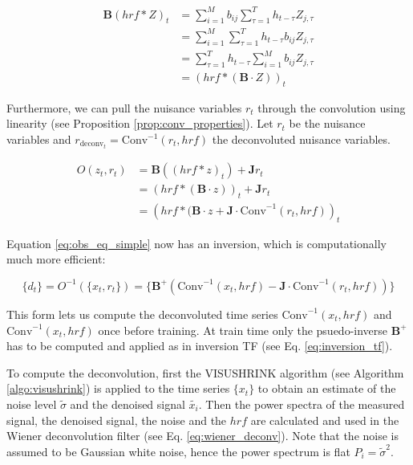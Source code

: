 \begin{align}
    \boldsymbol{B} ( hrf \ast Z)_t &= \sum_{i=1}^{M} b_{ij} \sum_{\tau=1}^{T} h_{t - \tau} Z_{j, \tau}  \\
                      &= \sum_{i=1}^{M} \sum_{\tau=1}^{T} h_{t - \tau} b_{ij} Z_{j, \tau} \\
                      &= \sum_{\tau=1}^{T} h_{t - \tau} \sum_{i=1}^{M}  b_{ij} Z_{j, \tau} \\
                      &= \left(hrf \ast (\boldsymbol{B} \cdot Z) \right)_t
\end{align}

Furthermore, we can pull the nuisance variables $r_t$ through the convolution using linearity (see Proposition \ref{prop:conv_properties}). Let $r_t$ be the nuisance variables
and $r_{\text{deconv}_t} = \text{Conv}^{-1}(r_t, hrf)$ the deconvoluted nuisance variables.

\begin{align}
    O(z_t, r_t) &= \boldsymbol{B} \left( (hrf \ast z)_t\right) + \boldsymbol{J}r_t \\
                &= \left(hrf \ast (\boldsymbol{B} \cdot z) \right)_t + \boldsymbol{J}r_t \\
                &= \left(hrf \ast (\boldsymbol{B} \cdot z + \boldsymbol{J} \cdot \text{Conv}^{-1}(r_t, hrf) \right)_t \label{eq:obs_eq_simple}
\end{align}

Equation \ref{eq:obs_eq_simple} now has an inversion, which is computationally much more efficient:

\begin{equation}
    \{d_t\} = O^{-1}(\{x_t, r_t\}) = \{\boldsymbol{B}^{+} \left( \text{Conv}^{-1}(x_t, hrf) - \boldsymbol{J} \cdot \text{Conv}^{-1}(r_t, hrf) \right) \}
\end{equation}

This form lets us compute the deconvoluted time series $\text{Conv}^{-1}(x_t, hrf)$ and \newline $\text{Conv}^{-1}(x_t, hrf)$ once before training. At train time only the 
psuedo-inverse $\boldsymbol{B}^+$ has to be computed and applied as in inversion TF (see Eq. \ref{eq:inversion_tf}).

To compute the deconvolution, first the VISUSHRINK algorithm (see Algorithm \ref{algo:visushrink}) is applied to the time series $\{x_t\}$ to obtain an estimate of the 
noise level $\tilde{\sigma}$ and the denoised signal $\tilde{x_i}$. Then the power spectra of the measured signal, the denoised signal, the noise and the $hrf$
are calculated and used in the Wiener deconvolution filter (see Eq. \ref{eq:wiener_deconv}).
Note that the noise is assumed to be Gaussian white noise, hence the power spectrum is flat $P_i = \tilde{\sigma}^2$.

